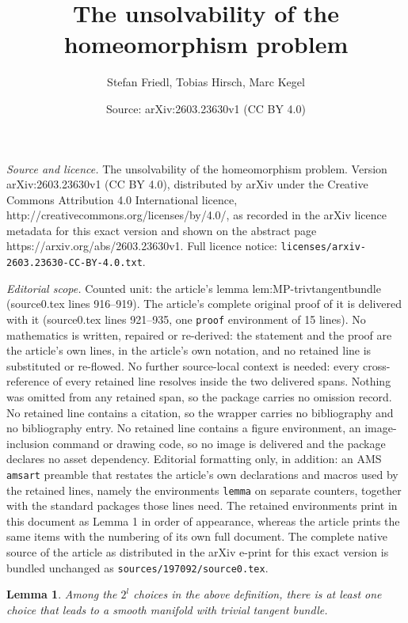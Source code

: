 \documentclass[10pt,a4paper]{amsart}
\title{The unsolvability of the homeomorphism problem}
\author{Stefan Friedl, Tobias Hirsch, Marc Kegel}
\date{Source: arXiv:2603.23630v1 (CC BY 4.0)}
\newtheorem{lemma}{Lemma}
\begin{document}
\maketitle

\noindent\emph{Source and licence.} The unsolvability of the homeomorphism problem. Version arXiv:2603.23630v1 (CC BY 4.0), distributed by arXiv under the Creative Commons Attribution 4.0 International licence, http://creativecommons.org/licenses/by/4.0/, as recorded in the arXiv licence metadata for this exact version and shown on the abstract page https://arxiv.org/abs/2603.23630v1. Full licence notice: \texttt{licenses/arxiv-2603.23630-CC-BY-4.0.txt}.\par\smallskip

\noindent\textit{Editorial scope.} Counted unit: the article's lemma lem:MP-trivtangentbundle (source0.tex lines 916--919). The article's complete original proof of it is delivered with it (source0.tex lines 921--935, one \texttt{proof} environment of 15 lines). No mathematics is written, repaired or re-derived: the statement and the proof are the article's own lines, in the article's own notation, and no retained line is substituted or re-flowed.  No further source-local context is needed: every cross-reference of every retained line resolves inside the two delivered spans.  Nothing was omitted from any retained span, so the package carries no omission record.  No retained line contains a citation, so the wrapper carries no bibliography and no bibliography entry.  No retained line contains a figure environment, an image-inclusion command or drawing code, so no image is delivered and the package declares no asset dependency.  Editorial formatting only, in addition: an AMS \texttt{amsart} preamble that restates the article's own declarations and macros used by the retained lines, namely the environments \texttt{lemma} on separate counters, together with the standard packages those lines need.  The retained environments print in this document as Lemma 1 in order of appearance, whereas the article prints the same items with the numbering of its own full document.  The complete native source of the article as distributed in the arXiv e-print for this exact version is bundled unchanged as \texttt{sources/197092/source0.tex}.
\begin{lemma}
\label{lem:MP-trivtangentbundle}
Among the $2^l$ choices in the above definition, there is at least one choice that leads to a smooth manifold with trivial tangent bundle.
\end{lemma}
\end{document}
